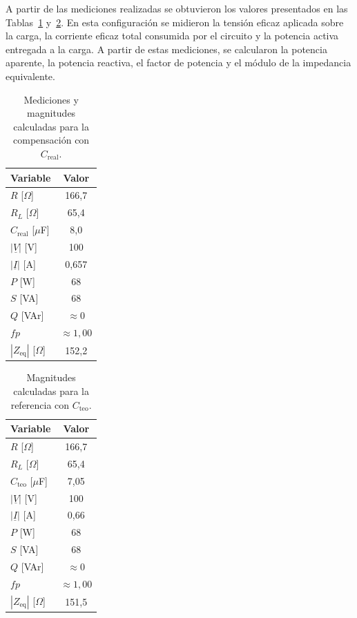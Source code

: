 A partir de las mediciones realizadas se obtuvieron los valores presentados en las Tablas~\ref{tab:tp3_compensacion_real} y~\ref{tab:tp3_compensacion_teorica}. En esta configuración se midieron la tensión eficaz aplicada sobre la carga, la corriente eficaz total consumida por el circuito y la potencia activa entregada a la carga. A partir de estas mediciones, se calcularon la potencia aparente, la potencia reactiva, el factor de potencia y el módulo de la impedancia equivalente.

\begin{table}[H]
    \centering
    \caption{Mediciones y magnitudes calculadas para la compensación con $C_{\text{real}}$.}
    \label{tab:tp3_compensacion_real}
    \begin{tabular}{lc}
        \toprule
        Variable & Valor \\
        \midrule
        $R$ [$\Omega$] & 166,7 \\
        $R_L$ [$\Omega$] & 65,4 \\
        $C_{\text{real}}$ [$\mu$F] & 8,0 \\
        $|\underline{V}|$ [V] & 100 \\
        $|\underline{I}|$ [A] & 0,657 \\
        $P$ [W] & 68 \\
        $S$ [VA] & 68 \\
        $Q$ [VAr] & $\approx 0$ \\
        $fp$ & $\approx 1,00$ \\
        $|Z_{\text{eq}}|$ [$\Omega$] & 152,2 \\
        \bottomrule
    \end{tabular}
\end{table}

\begin{table}[H]
    \centering
    \caption{Magnitudes calculadas para la referencia con $C_{\text{teo}}$.}
    \label{tab:tp3_compensacion_teorica}
    \begin{tabular}{lc}
        \toprule
        Variable & Valor \\
        \midrule
        $R$ [$\Omega$] & 166,7 \\
        $R_L$ [$\Omega$] & 65,4 \\
        $C_{\text{teo}}$ [$\mu$F] & 7,05 \\
        $|\underline{V}|$ [V] & 100 \\
        $|\underline{I}|$ [A] & 0,66 \\
        $P$ [W] & 68 \\
        $S$ [VA] & 68 \\
        $Q$ [VAr] & $\approx 0$ \\
        $fp$ & $\approx 1,00$ \\
        $|Z_{\text{eq}}|$ [$\Omega$] & 151,5 \\
        \bottomrule
    \end{tabular}
\end{table}
